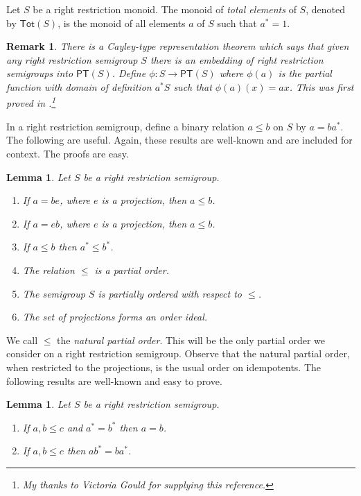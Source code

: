 \documentclass[a4paper]{amsart}
\newtheorem{lemma}[theorem]{Lemma}
\newtheorem{remark}[theorem]{Remark}
\begin{document}
Let $S$ be a right restriction monoid.
The monoid of {\em total elements} of $S$, denoted by $\mathsf{Tot}(S)$,
is the monoid of all elements $a$ of $S$ such that $a^{\ast} = 1$.


\begin{remark}\label{rem:hopkins}{\em There is a Cayley-type representation theorem which says that
given any right restriction semigroup $S$ there is an embedding of right restriction semigroups
into $\mathsf{PT}(S)$.
Define $\phi \colon S \rightarrow \mathsf{PT}(S)$
where $\phi(a)$ is the partial function with domain of definition $a^{\ast}S$
such that $\phi(a)(x) = ax$.
This was first proved in \cite{Trokh}.\footnote{My thanks to Victoria Gould for supplying this reference.}
}
\end{remark} 

In a right restriction semigroup,
define a binary relation $a \leq b$ on $S$ by $a = ba^{\ast}$.
The following are useful.
Again, these results are well-known and are included for context.
The proofs are easy.

\begin{lemma}\label{lem:two}  Let $S$ be a right restriction semigroup.
\begin{enumerate}
\item If $a = be$, where $e$ is a projection, then $a \leq b$.
\item If $a = eb$, where $e$ is a projection, then $a \leq b$.
\item If $a \leq b$ then $a^{\ast} \leq b^{\ast}$.
\item The relation $\leq$ is a partial order. 
\item The semigroup $S$ is partially ordered with respect to $\leq$.
\item The set of projections forms an order ideal.
\end{enumerate}
\end{lemma}

We call $\leq$ the {\em natural partial order}.
This will be the only partial order we consider on a right restriction semigroup.
Observe that the natural partial order, when restricted to the projections, is the usual order on idempotents.
The following results are well-known and easy to prove.

\begin{lemma}\label{lem:spiked} Let $S$ be a right restriction semigroup. 
\begin{enumerate}

\item If $a,b \leq c$ and $a^{\ast} = b^{\ast}$ then $a = b$.

\item If $a,b \leq c$ then $ab^{\ast} = ba^{\ast}$.

\end{enumerate}
\end{lemma}
\end{document}
